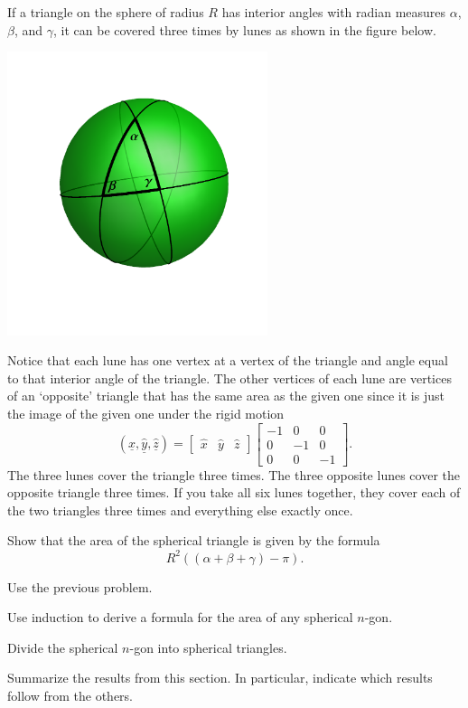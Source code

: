 \documentclass{ximera}
\begin{document}
If a triangle on the sphere of radius $R$ has interior angles with radian
measures $\alpha$, $\beta$, and $\gamma$, it can be covered three times by
lunes as shown in the figure below.%
\begin{image}
\includegraphics[width=3in]{W13_4.png}%
\end{image}
Notice that each lune has one vertex at a vertex of the triangle and angle
equal to that interior angle of the triangle. The other vertices of each lune
are vertices of an `opposite' triangle that has the same area as the given one
since it is just the image of the given one under the rigid motion%
\[
\left(  \underline{\hat{x}},\underline{\hat{y}},\underline{\hat{z}}\right)
=
\begin{bmatrix}
  \hat{x} & \hat{y} &\hat{z}
\end{bmatrix}  
\begin{bmatrix}
-1 & 0 & 0\\
0 & -1 & 0\\
0 & 0 & -1
\end{bmatrix}.
\]
The three lunes cover the triangle three times. The three opposite
lunes cover the opposite triangle three times. If you take all six
lunes together, they cover each of the two triangles three times and
everything else exactly once.

\begin{problem}
Show that the area of the spherical triangle is given by the
formula%
\[
R^{2}\left(  \left(  \alpha+\beta+\gamma\right)  -\pi\right).
\]
\begin{hint}
Use the previous problem.
\end{hint}
\end{problem}


\begin{problem}
Use induction to derive a formula for the area of any spherical
$n$-gon.
\begin{hint}
Divide the spherical $n$-gon into spherical triangles.
\end{hint}
\end{problem}


\begin{problem}
Summarize the results from this section. In particular, indicate which
results follow from the others.
\begin{freeResponse}
\end{freeResponse}
\end{problem}
\end{document}
